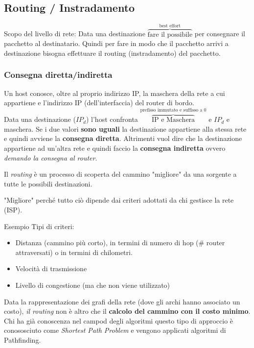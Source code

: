 \documentclass[a4paper]{article}
\begin{document}
\subsection{Routing / Instradamento}

Scopo del livello di rete: Data una destinazione $\overbrace{\text{fare il possibile}}^{\text{best effort}}$ per consegnare il pacchetto al destinatario.
Quindi per fare in modo che il pacchetto arrivi a destinazione bisogna effettuare il routing (instradamento) del pacchetto.

\subsubsection{Consegna diretta/indiretta}

Un host conosce, oltre al proprio indirizzo IP, la maschera della rete a cui appartiene e l'indirizzo IP (dell'interfaccia) del router di bordo. 
\\
Data una destinazione ($IP_d$) l'host confronta $\overbrace{\text{IP e Maschera}}^{\text{prefisso immutato e suffisso a 0}}$
e $IP_d$ e maschera. Se i due valori \textbf{sono uguali} la destinazione appartiene alla stessa rete e quindi avviene la \textbf{consegna diretta}.
Altrimenti vuol dire che la destinazione appartiene ad un'altra rete e quindi faccio la \textbf{consegna indiretta} ovvero \textit{demando la consegna al router}.

\begin{definition}
  Il \textit{routing} è un processo di scoperta del cammino "migliore" da una sorgente a tutte le possibili destinazioni. 
\end{definition}
\noindent
"Migliore" perché tutto ciò dipende dai criteri adottati da chi gestisce la rete (ISP).
\begin{examplebox}{Esempio}
  Tipi di criteri: 
  \begin{itemize}
    \item Distanza (cammino più corto), in termini di numero di hop (\# router attraversati) o in termini di chilometri.
    \item Velocità di trasmissione
    \item Livello di congestione (ma che non viene utilizzato)
\end{itemize}
\end{examplebox} 
\noindent
Data la rappresentazione dei grafi della rete (dove gli archi hanno associato un costo), \textit{il routing} non è altro che il \textbf{calcolo del cammino con il costo minimo}.
Chi ha già conoscenza nel campod degli algoritmi questo tipo di approccio è conososciuto come \textit{Shortest Path Problem} e vengono applicati 
algoritmi di Pathfinding.
\end{document}
